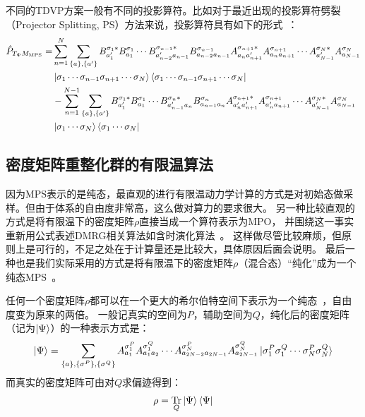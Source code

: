 \documentclass{article}
\DeclareMathOperator{\Tr}{Tr}
\begin{document}
不同的TDVP方案一般有不同的投影算符。比如对于最近出现的投影算符劈裂（Projector Splitting, PS）方法来说，投影算符具有如下的形式~\cite{Haeg16}：
\begin{equation}
\begin{aligned}
    \hat P_{T_{\Psi}M_{\text{MPS}}} = & \sum_{n=1}^N \sum_{\{a\},\{a'\}}
     B^{\sigma_1*}_{a'_1} B^{\sigma_1}_{a_1} \cdots B^{\sigma_{n-1}*}_{a'_{n-2}a_{n-1}} B^{\sigma_{n-1}}_{a_{n-2}a_{n-1}}
     A^{\sigma_{n+1}*}_{a_n a'_{n+1}} A^{\sigma_{n+1}}_{a_n a_{n+1}} \cdots A^{\sigma_N*}_{a'_{N-1}} A^{\sigma_N}_{a_{N-1}} \\
    &  \ket{ \sigma_1\cdots\sigma_{n-1}\sigma_{n+1}\cdots\sigma_N }
       \bra{ \sigma_1\cdots\sigma_{n-1}\sigma_{n+1}\cdots\sigma_N } \\
    & - \sum_{n=1}^{N-1} \sum_{\{a\},\{a'\}}
     B^{\sigma_1*}_{a'_1} B^{\sigma_1}_{a_1} \cdots B^{\sigma_{n}*}_{a'_{n-1}a_{n}} B^{\sigma_{n}}_{a_{n-1}a_{n}}
     A^{\sigma_{n+1}*}_{a'_n a'_{n+1}} A^{\sigma_{n+1}}_{a'_n a_{n+1}} \cdots A^{\sigma_N*}_{a'_{N-1}} A^{\sigma_N}_{a_{N-1}} \\
    &  \ket{ \sigma_1\cdots\sigma_N } \bra{ \sigma_1\cdots\sigma_N }
\end{aligned}
\end{equation}

\subsection{密度矩阵重整化群的有限温算法}

因为MPS表示的是纯态，最直观的进行有限温动力学计算的方式是对初始态做采样。但由于体系的自由度非常高，这么做对算力的要求很大。
另一种比较直观的方式是将有限温下的密度矩阵$\rho$直接当成一个算符表示为MPO，
并围绕这一事实重新用公式表述DMRG相关算法如含时演化算法~\cite{Vers04, Zwolak04}。
这样做尽管比较麻烦，但原则上是可行的，不足之处在于计算量还是比较大，具体原因后面会说明。
最后一种也是我们实际采用的方式是将有限温下的密度矩阵$\rho$（混合态）“纯化”成为一个纯态MPS~\cite{White05ft}。

任何一个密度矩阵$\rho$都可以在一个更大的希尔伯特空间下表示为一个纯态~\cite{nielsen00}，自由度变为原来的两倍。
一般记真实的空间为$P$，辅助空间为$Q$，纯化后的密度矩阵（记为$\ket{\Psi}$）的一种表示方式是：
\begin{equation}
    \ket{\Psi} 
      = \sum_{\{a\},\{\sigma^P\}, \{\sigma^Q\}}
     A^{\sigma_1^P}_{a_1} A^{\sigma^Q_1}_{a_1a_2} \cdots
           A^{\sigma_N^P}_{a_{2N-2}a_{2N-1}} A^{\sigma_N^Q}_{a_{2N-1}}  \ket{ \sigma^P_1\sigma^Q_1 \cdots \sigma^P_N \sigma^Q_N}    
\end{equation}
而真实的密度矩阵可由对$Q$求偏迹得到：
\begin{equation}
    \rho = \Tr_Q \ket{\Psi} \bra{\Psi}
\end{equation}
\end{document}

